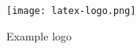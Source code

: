 \begin{figure}[!htbp]
	\texttt{[image: latex-logo.png]}
	\caption{Example logo}
	\label{figure-example}
\end{figure}